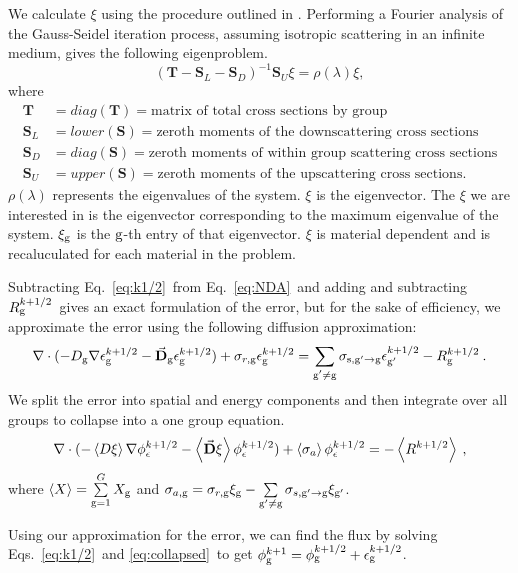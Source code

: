   We calculate $\xi$ using the procedure outlined in \cite{evans-upscat}. Performing a Fourier analysis of the Gauss-Seidel iteration process, assuming isotropic scattering in an infinite medium, gives the following eigenproblem. 
  \begin{equation}
      (\textbf{T} - \textbf{S}_L - \textbf{S}_D)^{-1}\textbf{S}_U \xi = \rho(\lambda)\xi,
  \end{equation}
  where
  \begin{align*}
      \textbf{T} &= diag(\textbf{T}) =  \text{matrix of total cross sections by group} \\
      \textbf{S}_L &= lower(\textbf{S}) = \text{zeroth moments of the downscattering cross sections} \\
      \textbf{S}_D &= diag(\textbf{S}) = \text{zeroth moments of within group scattering cross sections} \\
      \textbf{S}_U &= upper(\textbf{S}) = \text{zeroth moments of the upscattering cross sections.}
  \end{align*}
  $\rho(\lambda)$ represents the eigenvalues of the system. $\xi$ is the eigenvector. The $\xi$ we are interested in is the eigenvector corresponding to the maximum eigenvalue of the system. $\xi_{\mathrm{g}}$ is the $\mathrm{g}$-th entry of that eigenvector. $\xi$ is material dependent and is recaluculated for each material in the problem.
  \par
  Subtracting Eq.\ \eqref{eq:k1/2}\ from Eq.\ \eqref{eq:NDA}\ and adding and subtracting $R_{\mathrm{g}}^{k+1/2}$\ gives an exact formulation of the error, but for the sake of efficiency, we approximate the error using the following diffusion approximation:
  \begin{equation}
  \nabla\cdot(-D_{\mathrm{g}}  \nabla \epsilon_{\mathrm{g}}^{k+1/2} - \vec{\bf D}_{\mathrm{g}}
  \epsilon_{\mathrm{g}}^{k+1/2}) + \sigma_{r,\mathrm{g}}  \epsilon_{\mathrm{g}}^{k+1/2} =  \sum\limits_{\substack{{\mathrm{g}'}\neq\mathrm{g}}} \sigma_{\mathrm{s},\mathrm{g}' \to\mathrm{g}}  \epsilon_{\mathrm{g}'}^{k+1/2} -  R^{k+1/2}_{\mathrm{g}} \:.
  \end{equation}
  We split the error into spatial and energy components and then integrate over all groups to collapse into a one group equation.
  \begin{equation}
  \nabla\cdot(-\left< D \xi \right> \nabla \phi_{\epsilon}^{k+1/2} - \left<\vec{\bf D} \xi
  \right> \phi_{\epsilon}^{k+1/2}) + \left< \sigma_{a} \right> \phi_{\epsilon}^{k+1/2} = - \left< R^{k+1/2} \right> \:,\label{eq:collapsed}
  \end{equation}
  where $\left< X \right> = \sum\limits_{\mathrm{g} = 1}^G X_{\mathrm{g}} $ and $\sigma_{a,\mathrm{g}}  = \sigma_{r,\mathrm{g}}\xi_{\mathrm{g}} - \sum\limits_{{\mathrm{g}'}\neq\mathrm{g}} \sigma_{s,\mathrm{g}'\rightarrow \mathrm{g}} \xi_{\mathrm{g}'}$.
  \par
  Using our approximation for the error, we can find the flux by solving Eqs.\ \eqref{eq:k1/2}\ and \eqref{eq:collapsed}\ to get $\phi_{\mathrm{g}}^{k+1} = \phi_{\mathrm{g}}^{k+1/2} + \epsilon_{\mathrm{g}}^{k+1/2}$.